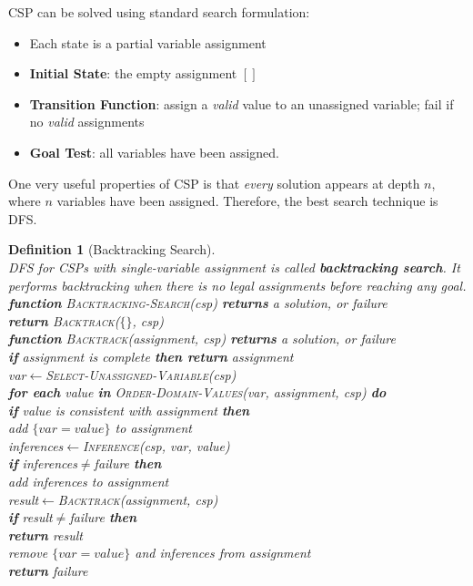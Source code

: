 \documentclass[12pt]{article}
\newcommand{\ind}{\hspace*{15pt}}
\newtheorem{definition}{Definition}[section]
\theoremstyle{definition}
\begin{document}
CSP can be solved using standard search formulation:
\begin{itemize}
	\item Each state is a partial variable assignment
	\item \textbf{Initial State}: the empty assignment $[]$
	\item \textbf{Transition Function}: assign a \textit{valid} value to an unassigned variable; fail if no \textit{valid} assignments
	\item \textbf{Goal Test}: all variables have been assigned.
\end{itemize}
One very useful properties of CSP is that \textit{every} solution appears at depth $n$, where $n$ variables have been assigned. Therefore, the best search technique is DFS.\\
\begin{definition}[Backtracking Search]
\hfill\\\normalfont DFS for CSPs with single-variable assignment is called \textbf{backtracking search}. It performs backtracking when there is no legal assignments before reaching any goal.\\
\textbf{function} \textsc{Backtracking-Search}(\textit{csp}) \textbf{returns} a solution, or failure\\
\ind \textbf{return} \textsc{Backtrack}($\{\}$, \textit{csp})\\
\textbf{function} \textsc{Backtrack}(\textit{assignment}, \textit{csp}) \textbf{returns} a solution, or failure\\
\ind \textbf{if} \textit{assignment} is complete \textbf{then return} \textit{assignment}\\
\ind \textit{var}$\leftarrow$\textsc{Select-Unassigned-Variable}(\textit{csp})\\
\ind \textbf{for each} \textit{value} \textbf{in} \textsc{Order-Domain-Values}(\textit{var}, \textit{assignment}, \textit{csp}) \textbf{do}\\ 
\ind \ind \textbf{if} \textit{value} is consistent with \textit{assignment} \textbf{then}\\
\ind \ind \ind add $\{\textit{var} = \textit{value}\}$ to \textit{assignment}\\
\ind \ind \ind \textit{inferences}$\leftarrow$\textsc{Inference}(\textit{csp}, \textit{var}, \textit{value})\\
\ind \ind \ind \textbf{if} \textit{inferences}$\neq$\textit{failure} \textbf{then}\\
\ind \ind \ind \ind add \textit{inferences} to \textit{assignment}\\
\ind \ind \ind \ind \textit{result}$\leftarrow$\textsc{Backtrack}(\textit{assignment}, \textit{csp})\\
\ind \ind \ind \ind \textbf{if} \textit{result}$\neq$\textit{failure} \textbf{then}\\
\ind \ind \ind \ind \ind \textbf{return} \textit{result}\\
\ind \ind remove $\{\textit{var}=\textit{value}\}$ and \textit{inferences} from \textit{assignment}\\
\ind \textbf{return} \textit{failure}
\end{definition}
\end{document}
